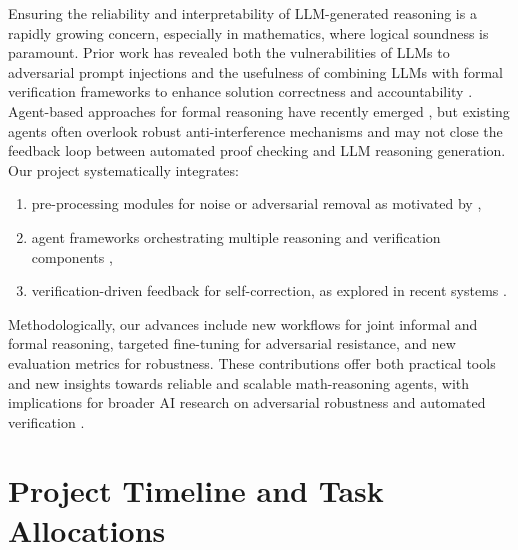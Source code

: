 \documentclass[a4paper,11pt]{article}
\begin{document}
Ensuring the reliability and interpretability of LLM-generated reasoning is a rapidly growing concern, especially in mathematics, where logical soundness is paramount. Prior work has revealed both the vulnerabilities of LLMs to adversarial prompt injections \cite{rajeev2025cats} and the usefulness of combining LLMs with formal verification frameworks to enhance solution correctness and accountability \cite{ren2025deepseek, liu2025safe, patel2025leantutor}. Agent-based approaches for formal reasoning have recently emerged \cite{baba2025proveragent, thakur2025langagent, thakur2024context}, but existing agents often overlook robust anti-interference mechanisms and may not close the feedback loop between automated proof checking and LLM reasoning generation. Our project systematically integrates:
\begin{enumerate}
    \item pre-processing modules for noise or adversarial removal as motivated by \cite{rajeev2025cats},
    \item agent frameworks orchestrating multiple reasoning and verification components \cite{baba2025proveragent, ren2025deepseek},
    \item verification-driven feedback for self-correction, as explored in recent systems \cite{liu2025safe, patel2025leantutor}.
\end{enumerate}
Methodologically, our advances include new workflows for joint informal and formal reasoning, targeted fine-tuning for adversarial resistance, and new evaluation metrics for robustness. These contributions offer both practical tools and new insights towards reliable and scalable math-reasoning agents, with implications for broader AI research on adversarial robustness and automated verification \cite{patel2025leantutor, ren2025deepseek}.




\section*{Project Timeline and Task Allocations}

\end{document}

